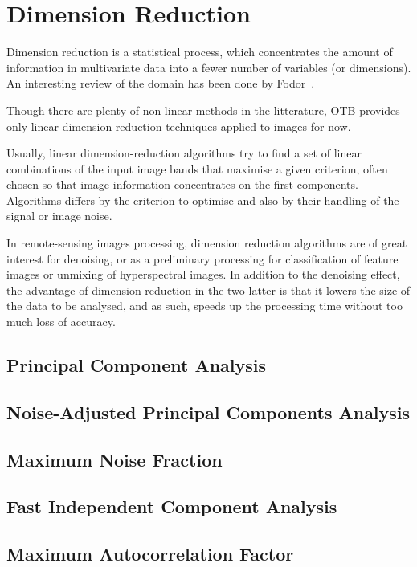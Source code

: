 \chapter{Dimension Reduction}\label{chap:dimred}

Dimension reduction is a statistical process, which concentrates the
amount of information in multivariate data into a fewer number of
variables (or dimensions). An interesting review of the domain has been done by Fodor~\cite{Fodor2002dimensionred}.

Though there are plenty of non-linear methods in the litterature, OTB
provides only linear dimension reduction techniques applied to images for now.

Usually, linear dimension-reduction algorithms try to find a set of
linear combinations of the input image bands that maximise a given
criterion, often chosen so that image information concentrates on the
first components. Algorithms differs by the criterion to optimise and
also by their handling of the signal or image noise.

In remote-sensing images processing, dimension reduction algorithms
are of great interest for denoising, or as a preliminary processing
for classification of feature images or unmixing of hyperspectral
images. In addition to the denoising effect, the advantage of
dimension reduction in the two latter is that it lowers the size of
the data to be analysed, and as such, speeds up the processing time
without too much loss of accuracy.

\section{Principal Component Analysis}



\section{Noise-Adjusted Principal Components Analysis}



\section{Maximum Noise Fraction}



\section{Fast Independent Component Analysis}



\section{Maximum Autocorrelation Factor}




